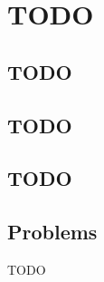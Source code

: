 \chapter{TODO}
\section{TODO}
\section{TODO}
\section{TODO}


\section{Problems}

\begin{exercise}
  TODO
\end{exercise}



